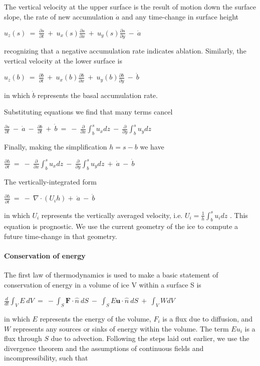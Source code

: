 The vertical velocity at the upper surface is the result of motion down
the surface slope, the rate of new accumulation $\dot{a}$ and any
time-change in surface height

$
u_{z} \left(s\right)~=~\frac{\partial s}{\partial t}~+~u_{x}(s)\frac{\partial s}{\partial x}~+~u_{y}(s)\frac{\partial s}{\partial y}~-~\dot{a} 
$

recognizing that a negative accumulation rate indicates ablation.
Similarly, the vertical velocity at the lower surface is

$
u_{z} \left(b\right)~=~\frac{\partial b}{\partial t}~+~u_{x}(b)\frac{\partial b}{\partial x}~+~u_{y}(b)\frac{\partial b}{\partial y}~-~\dot{b} 
$

in which $\dot{b}$ represents the basal accumulation rate.

Substituting equations we find that many terms cancel

$
\frac{\partial s}{\partial t}~-~\dot{a}~-~\frac{\partial b}{\partial t}~+~\dot{b}~=~-~\frac{\partial}{\partial x} \int_{b}^{s} u_{x} dz~-~\frac{\partial}{\partial y} \int_{b}^{s} u_{y} dz
$

Finally, making the simplification $h=s-b$ we have

$
\frac{\partial h}{\partial t}~=~-~\frac{\partial}{\partial x} \int_{b}^{s} u_{x} dz~-~\frac{\partial}{\partial y} \int_{b}^{s} u_{y} dz ~+~\dot{a}~-~\dot{b}
$

The vertically-integrated form

$
\frac{\partial h}{\partial t}~=~-~\nabla \cdot \left( U_{i} h \right) +~\dot{a}~-~\dot{b}
$

in which $U_{i}$ represents the vertically averaged velocity, i.e.
$U_i = \frac{1}{h}\int_{b}^{s}u_{i}dz$ . This equation is prognostic. We
use the current geometry of the ice to compute a future time-change in
that geometry.

\paragraph{Conservation of energy}

The first law of thermodynamics is used to make a basic statement of
conservation of energy in a volume of ice V within a surface S is

$
\frac{d}{d t} \int_{V}E ~dV~=~- \int_{S}\mathbf{F}\cdot \hat{n}~dS~-~\int_{S}E \mathbf{u}\cdot \hat{n}~dS~+~\int_{V}W dV
$

in which $E$ represents the energy of the volume, $F_{i}$ is a flux due
to diffusion, and $W$ represents any sources or sinks of energy within
the volume. The term $Eu_{i}$ is a flux through $S$ due to advection.
Following the steps laid out earlier, we use the divergence theorem and
the assumptions of continuous fields and incompressibility, such that

